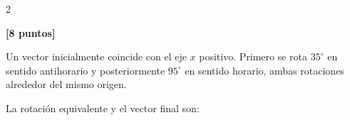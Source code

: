 \documentclass[10pt]{article}
\begin{document}
    \begin{multicols}{2}
        \raggedcolumns


        \begin{question}
            \textbf{[8 puntos]}

            Un vector inicialmente coincide con el eje \(x\) positivo.
            Primero se rota \(35^\circ\) en sentido antihorario y posteriormente
            \(95^\circ\) en sentido horario, ambas rotaciones alrededor del
            mismo origen.

            La rotación equivalente y el vector final son:

            \begin{inlineanswers}



            \end{inlineanswers}
        \end{question}


\end{multicols}
\end{document}
